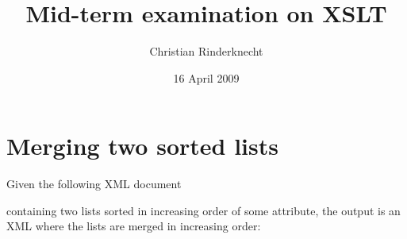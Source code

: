 \documentclass[11pt,a4paper]{article}
\title{Mid-term examination on XSLT}
\author{Christian Rinderknecht}
\date{16 April 2009}
\newcommand\XML{\textsf{XML}\xspace}
\begin{document}
\maketitle

\thispagestyle{empty}

\section{Merging two sorted lists}

Given the following \XML document


\noindent containing two lists sorted in increasing order of some
attribute, the output is an \XML where the lists are merged in
increasing order:

\end{document}
